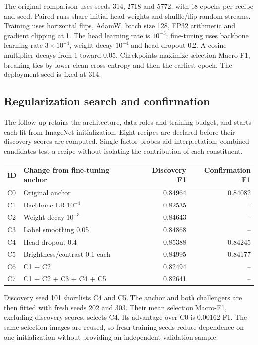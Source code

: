 The original comparison uses seeds 314, 2718 and 5772, with 18 epochs per recipe and seed. Paired runs share initial head weights and shuffle/flip random streams. Training uses horizontal flips, AdamW, batch size 128, FP32 arithmetic and gradient clipping at 1. The head learning rate is $10^{-3}$; fine-tuning uses backbone learning rate $3\times10^{-4}$, weight decay $10^{-4}$ and head dropout 0.2. A cosine multiplier decays from 1 toward 0.05. Checkpoints maximize selection Macro-F1, breaking ties by lower clean cross-entropy and then the earliest epoch. The deployment seed is fixed at 314.

\subsection{Regularization search and confirmation}
The follow-up retains the architecture, data roles and training budget, and starts each fit from ImageNet initialization. Eight recipes are declared before their discovery scores are computed. Single-factor probes aid interpretation; combined candidates test a recipe without isolating the contribution of each constituent.

\begin{center}\small
\begin{tabular}{llrr}\toprule
ID & Change from fine-tuning anchor & Discovery F1 & Confirmation F1\\\midrule
C0 & Original anchor & 0.84964 & 0.84082\\
C1 & Backbone LR $10^{-4}$ & 0.82535 & --\\
C2 & Weight decay $10^{-3}$ & 0.84643 & --\\
C3 & Label smoothing 0.05 & 0.84868 & --\\
C4 & Head dropout 0.4 & 0.85388 & 0.84245\\
C5 & Brightness/contrast 0.1 each & 0.84995 & 0.84177\\
C6 & C1 + C2 & 0.82494 & --\\
C7 & C1 + C2 + C3 + C4 + C5 & 0.82641 & --\\\bottomrule
\end{tabular}\end{center}
Discovery seed 101 shortlists C4 and C5. The anchor and both challengers are then fitted with fresh seeds 202 and 303. Their mean selection Macro-F1, excluding discovery scores, selects C4. Its advantage over C0 is 0.00162 F1. The same selection images are reused, so fresh training seeds reduce dependence on one initialization without providing an independent validation sample.

